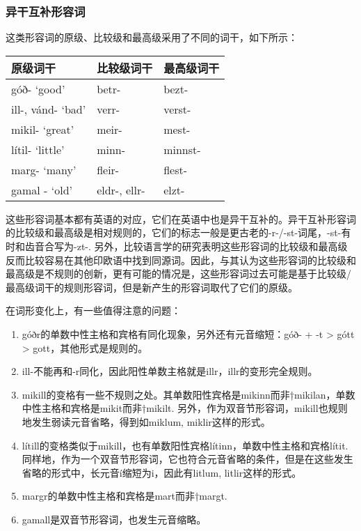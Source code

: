 \subsubsection{异干互补形容词}

这类形容词的原级、比较级和最高级采用了不同的词干，如下所示：

\begin{longtable}{lll}
    \toprule
    原级词干          & 比较级词干   & 最高级词干 \\
    \midrule
    \endhead
    \bottomrule
    \endfoot
    góð- `good‌'       & betr-        & bezt-      \\
    ill-, vánd- `bad‌' & verr-        & verst-     \\
    mikil- `great‌'    & meir-        & mest-      \\
    lítil- `little‌'   & minn-        & minnst-    \\
    marg- `many‌'      & fleir-       & flest-     \\
    gamal - `old‌'     & eldr-, ellr- & elzt-      \\
\end{longtable}

这些形容词基本都有英语的对应，它们在英语中也是异干互补的。异干互补形容词的比较级和最高级是相对规则的，它们的标志一般是更古老的-r-/-st-词尾，-st-有时和齿音合写为-zt-. 另外，比较语言学的研究表明这些形容词的比较级和最高级反而比较容易在其他印欧语中找到同源词。因此，与其认为这些形容词的比较级和最高级是不规则的创新，更有可能的情况是，这些形容词过去可能是基于比较级/最高级词干的规则形容词，但是新产生的形容词取代了它们的原级。

在词形变化上，有一些值得注意的问题：

\begin{enumerate}
    \item
          góðr的单数中性主格和宾格有同化现象，另外还有元音缩短：góð- + -t
          > gótt > gott，其他形式是规则的。
    \item
          ill-不能再和-r同化，因此阳性单数主格就是illr，illr的变形完全规则。
    \item
          mikill的变格有一些不规则之处。其单数阳性宾格是mikinn而非†mikilan，单数中性主格和宾格是mikit而非†mikilt.
          另外，作为双音节形容词，mikill也规则地发生弱读元音省略，得到如miklum,
          miklir这样的形式。
    \item
          lítill的变格类似于mikill，也有单数阳性宾格lítinn，单数中性主格和宾格lítit.
          同样地，作为一个双音节形容词，它也符合元音省略的条件，但是在这些发生省略的形式中，长元音í缩短为i，因此有litlum,
          litlir这样的形式。
    \item
          margr的单数中性主格和宾格是mart而非†margt.
    \item
          gamall是双音节形容词，也发生元音缩略。
\end{enumerate}


